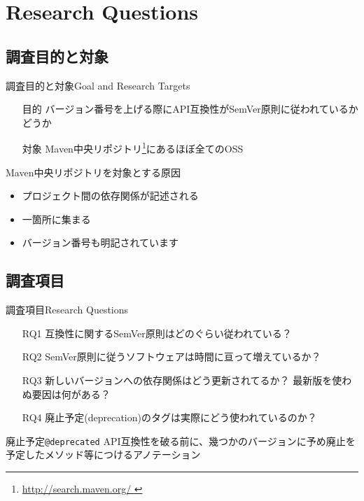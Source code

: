 \section{Research Questions}
\subsection{調査目的と対象}
\begin{frame}{調査目的と対象}{Goal and Research Targets}
\begin{itemize}
\item[目的] バージョン番号を上げる際にAPI互換性がSemVer原則に従われているかどうか
\item[対象] Maven中央リポジトリ\footnote{\url{http://search.maven.org/
}}にあるほぼ全てのOSS
\end{itemize}
\pause
\begin{block}{Maven中央リポジトリを対象とする原因}
\begin{itemize}
\item プロジェクト間の依存関係が記述される
\item 一箇所に集まる
\item バージョン番号も明記されています
\end{itemize}
\end{block}
\end{frame}
\subsection{調査項目}
\begin{frame}{調査項目}{Research Questions}
\begin{itemize}
\item[RQ1] 互換性に関するSemVer原則はどのぐらい従われている？
\item[RQ2] SemVer原則に従うソフトウェアは時間に亘って増えているか？
\item[RQ3] 新しいバージョンへの依存関係はどう更新されてるか？
最新版を使わぬ要因は何がある？
\item[RQ4] 廃止予定(deprecation)のタグは実際にどう使われているのか？
\end{itemize}
\pause
{\small
\begin{block}{廃止予定\texttt{@deprecated}}
API互換性を破る前に、幾つかのバージョンに予め廃止を予定したメソッド等につけるアノテーション
\end{block}
}
\end{frame}
